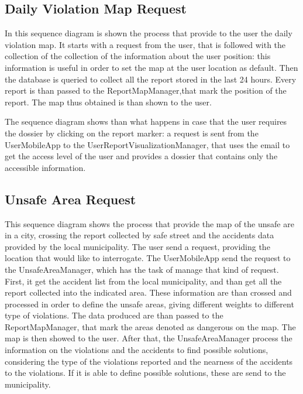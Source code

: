 \documentclass[../RASD.tex]{subfiles}
\begin{document}
    \subsection{Daily Violation Map Request}\label{subsec:daily-violation-map-request}
    \begin{figure}[H]
    \end{figure}
    In this sequence diagram is shown the process that provide to the user the daily violation map.
    It starts with a request from the user, that is followed with the collection of the collection of the information about the user position:
    this information is useful in order to set the map at the user location as default.
    Then the database is queried to collect all the report stored in the last 24 hours.
    Every report is than passed to the ReportMapManager,that mark the position of the report.
    The map thus obtained is than shown to the user.

    The sequence diagram shows than what happens in case that the user requires the dossier by clicking on the report marker:
    a request is sent from the UserMobileApp to the UserReportVisualizationManager, that uses the email to get the access level of the user and provides
    a dossier that contains only the accessible information.
    \subsection{Unsafe Area Request}\label{subsec:unsafe-area-request}
    \begin{figure}[H]
    \end{figure}
    This sequence diagram shows the process that provide the map of the unsafe are in a city,
    crossing the report collected by safe street and the accidents data provided by the local municipality.
    The user send a request, providing the location that would like to interrogate.
    The UserMobileApp send the request to the UnsafeAreaManager, which has the task of manage that kind of request.
    First, it get the accident list from the local municipality, and than get all the report collected into the indicated area.
    These information are than crossed and processed in order to define the unsafe areas, giving different weights to different type of violations.
    The data produced are than passed to the ReportMapManager, that mark the areas denoted as dangerous on the map.
    The map is then showed to the user.
    After that, the UnsafeAreaManager process the information on the violations and the accidents to find possible solutions,
    considering the type of the violations reported and the nearness of the accidents to the violations.
    If it is able to define possible solutions, these are send to the municipality.
\end{document}
